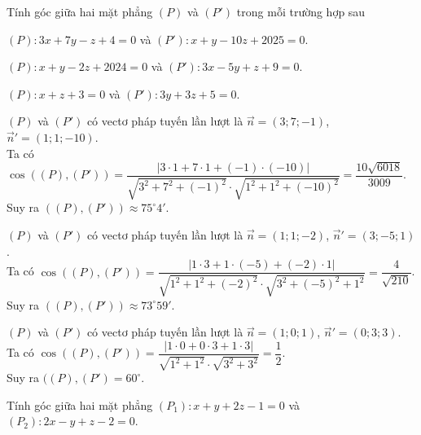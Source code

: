 \begin{bt}%
	Tính góc giữa hai mặt phẳng $(P)$ và $(P')$ trong mỗi trường hợp sau
	\begin{listEX}[1]
		\item $(P)\colon 3x+7y-z+4=0$ và $(P')\colon x+y-10z+2025=0$.
		\item $(P)\colon x+y-2z+2024=0$ và $(P')\colon 3x-5y+z+9=0$.
		\item $(P)\colon x+z+3=0$ và $(P')\colon 3y+3z+5=0$.
	\end{listEX}
	\loigiai
	{
		\begin{listEX}[1]
			\item $(P)$ và $(P')$ có vectơ pháp tuyến lần lượt là $\overrightarrow{n}=(3;7;-1)$, $\overrightarrow{n}'=(1;1;-10)$.\\
			Ta có $\cos\left ((P),(P') \right )=\dfrac{\left |3\cdot 1+7\cdot 1+(-1)\cdot (-10) \right |}{\sqrt{3^2+7^2+(-1)^2}\cdot\sqrt{1^2+1^2+(-10)^2}}=\dfrac{10\sqrt{6018}}{3009}$.\\
			Suy ra $((P),(P'))\approx 75^{\circ}4'$.
			\item $(P)$ và $(P')$ có vectơ pháp tuyến lần lượt là $\overrightarrow{n}=(1;1;-2)$, $\overrightarrow{n}'=(3;-5;1)$.\\
			Ta có $\cos\left ((P),(P') \right )=\dfrac{\left |1\cdot 3+1\cdot (-5)+(-2)\cdot 1 \right |}{\sqrt{1^2+1^2+(-2)^2}\cdot\sqrt{3^2+(-5)^2+1^2}}=\dfrac{4}{\sqrt{210}}$.\\
			Suy ra $((P),(P'))\approx 73^{\circ}59'$.
			\item $(P)$ và $(P')$ có vectơ pháp tuyến lần lượt là $\overrightarrow{n}=(1;0;1)$, $\overrightarrow{n}'=(0;3;3)$.\\
			Ta có $\cos\left ((P),(P') \right )=\dfrac{\left |1\cdot 0+0\cdot 3+1\cdot 3 \right |}{\sqrt{1^2+1^2}\cdot\sqrt{3^2+3^2}}=\dfrac{1}{2}$.\\
			Suy ra $((P),(P')=60^{\circ}$.
		\end{listEX}
	}
\end{bt}

\begin{vd}%
	Tính góc giữa hai mặt phẳng $(P_1)\colon x+y+2z-1=0$ và $(P_2)\colon 2x-y+z-2=0$.
\end{vd}

